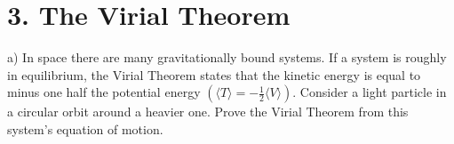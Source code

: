 \section*{3. The Virial Theorem}

a) In space there are many gravitationally bound systems. If a system is roughly in equilibrium, the 
Virial Theorem states that the kinetic energy is equal to minus one half the potential energy 
$(\langle T \rangle = -\frac{1}{2} \langle V \rangle)$. Consider a light particle in a circular orbit
around a heavier one. Prove the Virial Theorem from this system's equation of motion.\\
\\
